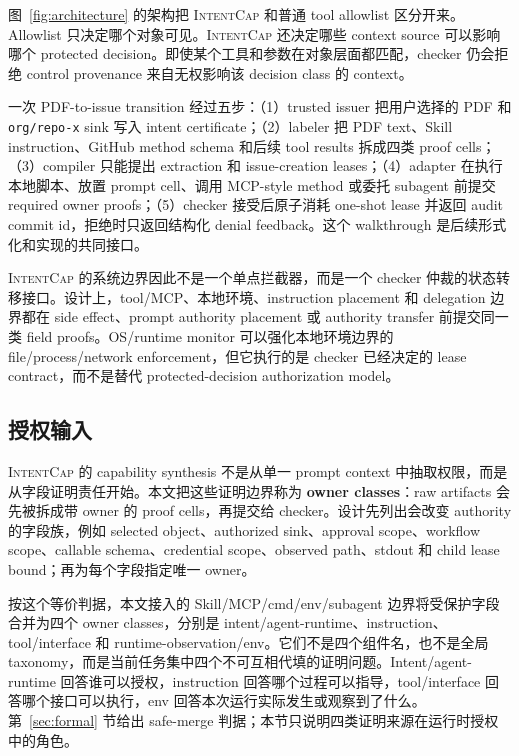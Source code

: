 \documentclass[UTF8,a4paper,11pt]{ctexart}
\newcommand{\sys}{\textsc{IntentCap}\xspace}
\begin{document}
图~\ref{fig:architecture} 的架构把 \sys 和普通 tool allowlist 区分开来。Allowlist 只决定哪个对象可见。\sys 还决定哪些 context source 可以影响哪个 protected decision。即使某个工具和参数在对象层面都匹配，checker 仍会拒绝 control provenance 来自无权影响该 decision class 的 context。

一次 PDF-to-issue transition 经过五步：（1）trusted issuer 把用户选择的 PDF 和 \texttt{org/repo-x} sink 写入 intent certificate；（2）labeler 把 PDF text、Skill instruction、GitHub method schema 和后续 tool results 拆成四类 proof cells；（3）compiler 只能提出 extraction 和 issue-creation leases；（4）adapter 在执行本地脚本、放置 prompt cell、调用 MCP-style method 或委托 subagent 前提交 required owner proofs；（5）checker 接受后原子消耗 one-shot lease 并返回 audit commit id，拒绝时只返回结构化 denial feedback。这个 walkthrough 是后续形式化和实现的共同接口。

\sys 的系统边界因此不是一个单点拦截器，而是一个 checker 仲裁的状态转移接口。设计上，tool/MCP、本地环境、instruction placement 和 delegation 边界都在 side effect、prompt authority placement 或 authority transfer 前提交同一类 field proofs。OS/runtime monitor 可以强化本地环境边界的 file/process/network enforcement，但它执行的是 checker 已经决定的 lease contract，而不是替代 protected-decision authorization model。

\subsection{授权输入}

\sys 的 capability synthesis 不是从单一 prompt context 中抽取权限，而是从字段证明责任开始。本文把这些证明边界称为 \textbf{owner classes}：raw artifacts 会先被拆成带 owner 的 proof cells，再提交给 checker。设计先列出会改变 authority 的字段族，例如 selected object、authorized sink、approval scope、workflow scope、callable schema、credential scope、observed path、stdout 和 child lease bound；再为每个字段指定唯一 owner。

按这个等价判据，本文接入的 Skill/MCP/cmd/env/subagent 边界将受保护字段合并为四个 owner classes，分别是 intent/agent-runtime、instruction、tool/interface 和 runtime-observation/env。它们不是四个组件名，也不是全局 taxonomy，而是当前任务集中四个不可互相代填的证明问题。Intent/agent-runtime 回答谁可以授权，instruction 回答哪个过程可以指导，tool/interface 回答哪个接口可以执行，env 回答本次运行实际发生或观察到了什么。第~\ref{sec:formal} 节给出 safe-merge 判据；本节只说明四类证明来源在运行时授权中的角色。
\end{document}
